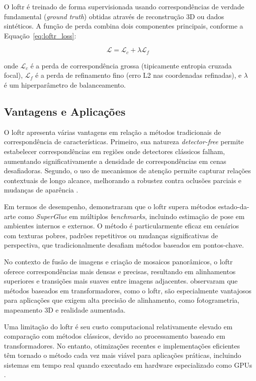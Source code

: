 O \gls{loftr} é treinado de forma supervisionada usando correspondências de verdade fundamental (\textit{ground truth}) obtidas através de reconstrução 3D ou dados sintéticos. A função de perda combina dois componentes principais, conforme a Equação~\ref{eq:loftr_loss}:

\begin{equation}
\label{eq:loftr_loss}
\mathcal{L} = \mathcal{L}_{c} + \lambda \mathcal{L}_{f}
\end{equation}

\noindent onde $\mathcal{L}_{c}$ é a perda de correspondência grossa (tipicamente entropia cruzada focal), $\mathcal{L}_{f}$ é a perda de refinamento fino (erro L2 nas coordenadas refinadas), e $\lambda$ é um hiperparâmetro de balanceamento.

\subsection*{Vantagens e Aplicações}

O \gls{loftr} apresenta várias vantagens em relação a métodos tradicionais de correspondência de características. Primeiro, sua natureza \textit{detector-free} permite estabelecer correspondências em regiões onde detectores clássicos falham, aumentando significativamente a densidade de correspondências em cenas desafiadoras. Segundo, o uso de mecanismos de atenção permite capturar relações contextuais de longo alcance, melhorando a robustez contra oclusões parciais e mudanças de aparência \cite{Sun2021}.

Em termos de desempenho,  demonstraram que o \gls{loftr} supera métodos estado-da-arte como \textit{SuperGlue} em múltiplos \textit{benchmarks}, incluindo estimação de pose em ambientes internos e externos. O método é particularmente eficaz em cenários com texturas pobres, padrões repetitivos ou mudanças significativas de perspectiva, que tradicionalmente desafiam métodos baseados em pontos-chave.

No contexto de fusão de imagens e criação de mosaicos panorâmicos, o \gls{loftr} oferece correspondências mais densas e precisas, resultando em alinhamentos superiores e transições mais suaves entre imagens adjacentes.  observaram que métodos baseados em transformadores, como o \gls{loftr}, são especialmente vantajosos para aplicações que exigem alta precisão de alinhamento, como fotogrametria, mapeamento 3D e realidade aumentada.

Uma limitação do \gls{loftr} é seu custo computacional relativamente elevado em comparação com métodos clássicos, devido ao processamento baseado em transformadores. No entanto, otimizações recentes e implementações eficientes têm tornado o método cada vez mais viável para aplicações práticas, incluindo sistemas em tempo real quando executado em hardware especializado como GPUs \cite{Sun2021}.




